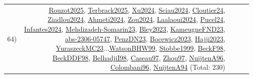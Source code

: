 {\begin{longtable}{p{3cm}r>{\raggedright\arraybackslash}p{6cm}>{\raggedright\arraybackslash}p{6cm}>{\raggedright\arraybackslash}p{8cm}}
64) & \hyperref[detail:Rouzot2025]{Rouzot2025}, \hyperref[detail:Terbrack2025]{Terbrack2025}, \hyperref[detail:Xu2024]{Xu2024}, \hyperref[detail:Sciau2024]{Sciau2024}, \hyperref[detail:Cloutier24]{Cloutier24}, \hyperref[detail:Ziadlou2024]{Ziadlou2024}, \hyperref[detail:Ahmeti2024]{Ahmeti2024}, \hyperref[detail:Zou2024]{Zou2024}, \hyperref[detail:Laalaoui2024]{Laalaoui2024}, \hyperref[detail:Pucel24]{Pucel24}, \hyperref[detail:Infantes2024]{Infantes2024}, \hyperref[detail:Mehdizadeh-Somarin23]{Mehdizadeh-Somarin23}, \hyperref[detail:Bley2023]{Bley2023}, \hyperref[detail:KameugneFND23]{KameugneFND23}, \hyperref[detail:abs-2306-05747]{abs-2306-05747}, \hyperref[detail:PenzDN23]{PenzDN23}, \hyperref[detail:Bocewicz2023]{Bocewicz2023}, \hyperref[detail:Hajji2023]{Hajji2023}, \hyperref[detail:YuraszeckMC23]{YuraszeckMC23}...\hyperref[detail:WatsonBHW99]{WatsonBHW99}, \hyperref[detail:Stobbe1999]{Stobbe1999}, \hyperref[detail:BeckF98]{BeckF98}, \hyperref[detail:BeckDDF98]{BeckDDF98}, \hyperref[detail:BelhadjiI98]{BelhadjiI98}, \hyperref[detail:Caseau97]{Caseau97}, \hyperref[detail:Zhou97]{Zhou97}, \hyperref[detail:NuijtenA96]{NuijtenA96}, \hyperref[detail:Colombani96]{Colombani96}, \hyperref[detail:NuijtenA94]{NuijtenA94} (Total: 230)\\

\end{longtable}}
